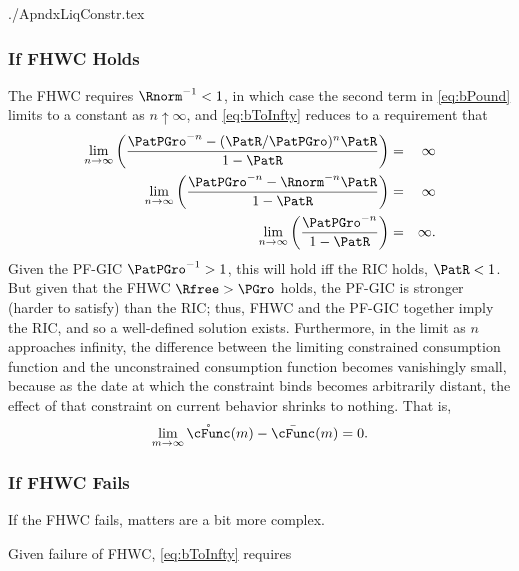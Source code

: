 \documentclass{econtex}
\begin{document}
\begin{verbatimwrite}{./ApndxLiqConstr.tex}
\subsubsection{If FHWC Holds}
The FHWC requires $\Rnorm^{-1} < 1$, in which case the second term in \eqref{eq:bPound} limits to a constant as $n \uparrow \infty$, and \eqref{eq:bToInfty} reduces to a requirement that
\begin{eqnarray*}
  \lim_{n \rightarrow \infty} \left(\frac{\PatPGro^{-n}-(\PatR/\PatPGro)^{n}\PatR}{1-\PatR}\right) & = & \infty
\\  \lim_{n \rightarrow \infty} \left(\frac{\PatPGro^{-n}-\Rnorm^{-n}\PatR}{1-\PatR}\right) & = & \infty
\\  \lim_{n \rightarrow \infty} \left(\frac{\PatPGro^{-n}}{1-\PatR}\right) & = & \infty.
\end{eqnarray*}
Given the PF-GIC $\PatPGro^{-1}>1$, this will hold iff the RIC holds, $\PatR < 1$.  But given that the FHWC
$\Rfree > \PGro$ holds, the PF-GIC is stronger (harder to satisfy) than the RIC; thus, FHWC
and the PF-GIC together imply the RIC, and so a well-defined
solution exists.  Furthermore, in the limit as $n$ approaches
infinity, the difference between the limiting constrained consumption
function and the unconstrained consumption function becomes
vanishingly small, because as the date at which the constraint binds
becomes arbitrarily distant, the effect of that constraint on current
behavior shrinks to nothing.  That is,
\begin{eqnarray}
\lim_{m \rightarrow \infty}\mathring{\cFunc}(m) - \bar{\cFunc}(m) = 0.
\end{eqnarray}


\subsubsection{If FHWC Fails}
If the FHWC fails, matters are a bit more complex.
\begin{comment}
As noted in the main text, the Finite Value Requirement for such a consumer
requires $\PatPGro < (\Rfree/\PGro)^{1/\CRRA}$,\footnote{A
  unique well-defined nondegenerate limiting consumption function can
  actually exist even if a nondegenerate value function does not.  But
  the parametric combinations required for this are somewhat peculiar
  (including both $\Rfree < 1$ and $\PGro < 1$); but we restrict our attention
  to the more useful and plausible cases with finite value.} which is stronger (holds
in strictly fewer circumstances) than the PF-GIC condition $\PatPGro < 1$.
Thus, the PF-GIC is an implication of \cancel{FHWC}.
\end{comment}
Given failure of FHWC, \eqref{eq:bToInfty} requires


\end{verbatimwrite}
\end{document}
